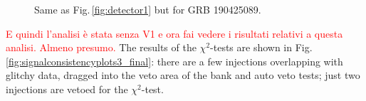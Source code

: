 \documentclass[binding=0.6cm, LaM]{sapthesis}
\newcommand{\fpg}[1]{\textcolor{red}{#1} }
\begin{document}
\begin{figure}[!t]
          \centering
          \caption{Same as Fig.\,\ref{fig:detector1} but for GRB 190425089.}
          \label{fig:detector3}
        \end{figure}

        \fpg{E quindi l'analisi \`e stata senza V1 e ora fai vedere i risultati relativi a questa analisi.  Almeno presumo.}
 	The results of the $\chi^2$-tests are shown in Fig.\,\ref{fig:signalconsistencyplots3_final}:
       	there are a few injections overlapping with glitchy data, dragged into the veto  area of the bank and  auto veto tests;
	just two injections are vetoed for the $\chi^2$-test.
                \begin{figure}[!t]
                        \noindent
                        \label{signalconsistencyplots3_final}

\end{figure}
\end{document}
